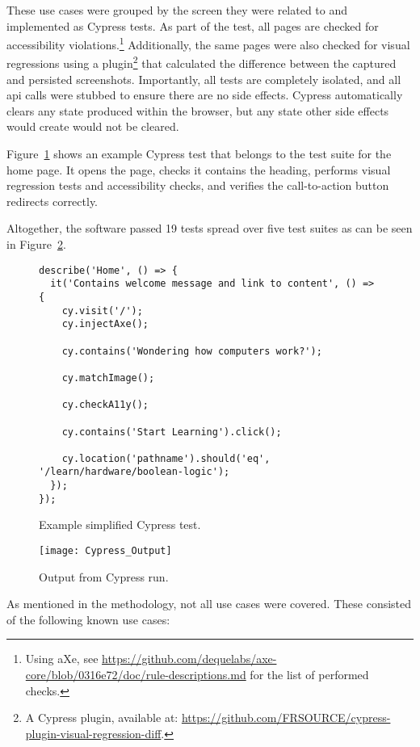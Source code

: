 These use cases were grouped by the screen they were related to and implemented as Cypress tests.
As part of the test, all pages are checked for accessibility violations.\footnote{Using aXe, see \url{https://github.com/dequelabs/axe-core/blob/0316e72/doc/rule-descriptions.md} for the list of performed checks.}
Additionally, the same pages were also checked for visual regressions using a plugin\footnote{A Cypress plugin, available at: \url{https://github.com/FRSOURCE/cypress-plugin-visual-regression-diff}.} that calculated the difference between the captured and persisted screenshots.
Importantly, all tests are completely isolated, and all \gls{api} calls were stubbed to ensure there are no side effects.
Cypress automatically clears any state produced within the browser, but any state other side effects would create would not be cleared.

Figure~\ref{fig:test-cypress-example} shows an example Cypress test that belongs to the test suite for the home page.
It opens the page, checks it contains the heading, performs visual regression tests and accessibility checks, and verifies the call-to-action button redirects correctly.

Altogether, the software passed 19 tests spread over five test suites as can be seen in Figure~\ref{fig:test-cypress}.

\begin{figure}[H]
\begin{verbatim}
describe('Home', () => {
  it('Contains welcome message and link to content', () => {
    cy.visit('/');
    cy.injectAxe();

    cy.contains('Wondering how computers work?');

    cy.matchImage();

    cy.checkA11y();

    cy.contains('Start Learning').click();

    cy.location('pathname').should('eq', '/learn/hardware/boolean-logic');
  });
});
\end{verbatim}
    \caption{Example simplified Cypress test.}
    \label{fig:test-cypress-example}
\end{figure}

\begin{figure}[H]
    \texttt{[image: Cypress\_Output]}
    \caption{Output from Cypress run.}
    \label{fig:test-cypress}
\end{figure}

As mentioned in the methodology, not all use cases were covered.
These consisted of the following known use cases:

